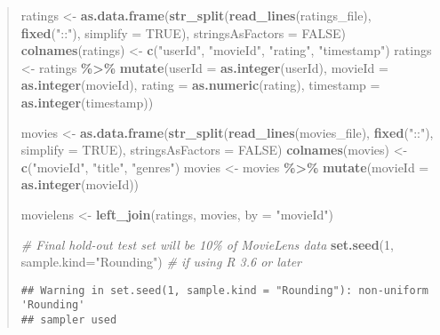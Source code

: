 \documentclass[
]{article}
\newenvironment{Shaded}{\begin{snugshade}}{\end{snugshade}}
\newcommand{\AttributeTok}[1]{\textcolor[rgb]{0.13,0.29,0.53}{#1}}
\newcommand{\CommentTok}[1]{\textcolor[rgb]{0.56,0.35,0.01}{\textit{#1}}}
\newcommand{\ConstantTok}[1]{\textcolor[rgb]{0.56,0.35,0.01}{#1}}
\newcommand{\DecValTok}[1]{\textcolor[rgb]{0.00,0.00,0.81}{#1}}
\newcommand{\FunctionTok}[1]{\textcolor[rgb]{0.13,0.29,0.53}{\textbf{#1}}}
\newcommand{\NormalTok}[1]{#1}
\newcommand{\OtherTok}[1]{\textcolor[rgb]{0.56,0.35,0.01}{#1}}
\newcommand{\SpecialCharTok}[1]{\textcolor[rgb]{0.81,0.36,0.00}{\textbf{#1}}}
\newcommand{\StringTok}[1]{\textcolor[rgb]{0.31,0.60,0.02}{#1}}
\begin{document}
\begin{quote}
\begin{Shaded}
\begin{Highlighting}[]
\NormalTok{ratings }\OtherTok{\textless{}{-}} \FunctionTok{as.data.frame}\NormalTok{(}\FunctionTok{str\_split}\NormalTok{(}\FunctionTok{read\_lines}\NormalTok{(ratings\_file), }\FunctionTok{fixed}\NormalTok{(}\StringTok{"::"}\NormalTok{), }\AttributeTok{simplify =} \ConstantTok{TRUE}\NormalTok{),}
                         \AttributeTok{stringsAsFactors =} \ConstantTok{FALSE}\NormalTok{)}
\FunctionTok{colnames}\NormalTok{(ratings) }\OtherTok{\textless{}{-}} \FunctionTok{c}\NormalTok{(}\StringTok{"userId"}\NormalTok{, }\StringTok{"movieId"}\NormalTok{, }\StringTok{"rating"}\NormalTok{, }\StringTok{"timestamp"}\NormalTok{)}
\NormalTok{ratings }\OtherTok{\textless{}{-}}\NormalTok{ ratings }\SpecialCharTok{\%\textgreater{}\%}
  \FunctionTok{mutate}\NormalTok{(}\AttributeTok{userId =} \FunctionTok{as.integer}\NormalTok{(userId),}
         \AttributeTok{movieId =} \FunctionTok{as.integer}\NormalTok{(movieId),}
         \AttributeTok{rating =} \FunctionTok{as.numeric}\NormalTok{(rating),}
         \AttributeTok{timestamp =} \FunctionTok{as.integer}\NormalTok{(timestamp))}

\NormalTok{movies }\OtherTok{\textless{}{-}} \FunctionTok{as.data.frame}\NormalTok{(}\FunctionTok{str\_split}\NormalTok{(}\FunctionTok{read\_lines}\NormalTok{(movies\_file), }\FunctionTok{fixed}\NormalTok{(}\StringTok{"::"}\NormalTok{), }\AttributeTok{simplify =} \ConstantTok{TRUE}\NormalTok{),}
                        \AttributeTok{stringsAsFactors =} \ConstantTok{FALSE}\NormalTok{)}
\FunctionTok{colnames}\NormalTok{(movies) }\OtherTok{\textless{}{-}} \FunctionTok{c}\NormalTok{(}\StringTok{"movieId"}\NormalTok{, }\StringTok{"title"}\NormalTok{, }\StringTok{"genres"}\NormalTok{)}
\NormalTok{movies }\OtherTok{\textless{}{-}}\NormalTok{ movies }\SpecialCharTok{\%\textgreater{}\%}
  \FunctionTok{mutate}\NormalTok{(}\AttributeTok{movieId =} \FunctionTok{as.integer}\NormalTok{(movieId))}

\NormalTok{movielens }\OtherTok{\textless{}{-}} \FunctionTok{left\_join}\NormalTok{(ratings, movies, }\AttributeTok{by =} \StringTok{"movieId"}\NormalTok{)}

\CommentTok{\# Final hold{-}out test set will be 10\% of MovieLens data}
\FunctionTok{set.seed}\NormalTok{(}\DecValTok{1}\NormalTok{, }\AttributeTok{sample.kind=}\StringTok{"Rounding"}\NormalTok{) }\CommentTok{\# if using R 3.6 or later}
\end{Highlighting}
\end{Shaded}

\begin{verbatim}
## Warning in set.seed(1, sample.kind = "Rounding"): non-uniform 'Rounding'
## sampler used
\end{verbatim}


\end{quote}
\end{document}
